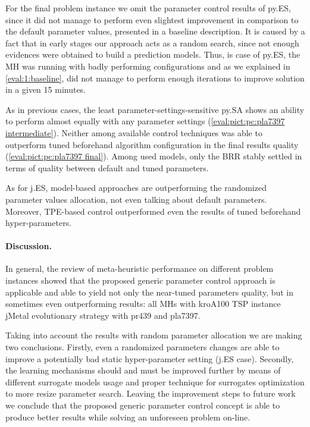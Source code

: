 For the final problem instance we omit the parameter control results of py.ES, since it did not manage to perform even slightest improvement in comparison to the default parameter values, presented in a baseline description. It is caused by a fact that in early stages our approach acts as a random search, since not enough evidences were obtained to build a prediction models. Thus, is case of py.ES, the MH was running with badly performing configurations and as we explained in \cref{eval:1:baseline}, did not manage to perform enough iterations to improve solution in a given 15 minutes.

As in previous cases, the least parameter-settings-sensitive py.SA shows an ability to perform almost equally with any parameter settings (\cref{eval:pict:pc:pla7397 intermediate}). Neither among available control techniques was able to outperform tuned beforehand algorithm configuration in the final results quality (\cref{eval:pict:pc:pla7397 final}). Among used models, only the BRR stably settled in terms of quality between default and tuned parameters.

As for j.ES, model-based approaches are outperforming the randomized parameter values allocation, not even talking about default parameters. Moreover, TPE-based control outperformed even the results of tuned beforehand hyper-parameters.


\paragraph{Discussion.} In general, the review of meta-heuristic performance on different problem instances showed that the proposed generic parameter control approach is applicable and able to yield not only the near-tuned parameters quality, but in sometimes even outperforming results: all MHs with kroA100 TSP instance jMetal evolutionary strategy with pr439 and pla7397.

Taking into account the results with random parameter allocation we are making two conclusions. Firstly, even a randomized parameters changes are able to improve a potentially bad static hyper-parameter setting (j.ES case). Secondly, the learning mechanisms should and must be improved further by means of different surrogate models usage and proper technique for surrogates optimization to more resize parameter search. Leaving the improvement steps to future work we conclude that the proposed generic parameter control concept is able to produce better results while solving an unforeseen problem on-line.


